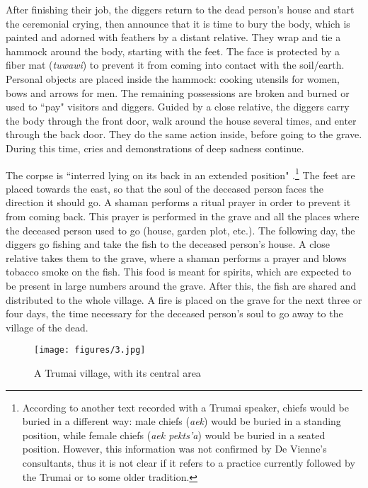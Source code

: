 \documentclass[output=paper,
modfonts,nonflat
]{langsci/langscibook}
\begin{document}
After finishing their job, the diggers return to the dead person's house and start the ceremonial crying, then announce that it is time to bury the body, which is painted and adorned with feathers by a distant relative. They wrap and tie a hammock around the body, starting with the feet. The face is protected by a fiber mat (\textit{tuwawi}) to prevent it from coming into contact with the soil/earth. Personal objects are placed inside the hammock: cooking utensils for women, bows and arrows for men. The remaining possessions are broken and burned or used to “pay" visitors and diggers. Guided by a close relative, the diggers carry the body through the front door, walk around the house several times, and enter through the back door. They do the same action inside, before going to the grave. During this time, cries and demonstrations of deep sadness continue.

The corpse is “interred lying on its back in an extended position" \citep[90]{MurphyQuain1955}.\footnote{According to another text recorded with a Trumai speaker, chiefs would be buried in a different way: male chiefs (\textit{aek}) would be buried in a standing position, while female chiefs (\textit{aek pekts'a}) would be buried in a seated position. However, this information was not confirmed by De Vienne's consultants, thus it is not clear if it refers to a practice currently followed by the Trumai or to some older tradition.} The feet are placed towards the east, so that the soul of the deceased person faces the direction it should go. A shaman performs a ritual prayer in order to prevent it from coming back. This prayer is performed in the grave and all the places where the deceased person used to go (house, garden plot, etc.). The following day, the diggers go fishing and take the fish to the deceased person's house. A close relative takes them to the grave, where a shaman performs a prayer and blows tobacco smoke on the fish. This food is meant for spirits, which are expected to be present in large numbers around the grave. After this, the fish are shared and distributed to the whole village. A fire is placed on the grave for the next three or four days, the time necessary for the deceased person's soul to go away to the village of the dead.



\begin{figure} 
  \texttt{[image: figures/3.jpg]}
  \caption{A Trumai village, with its central area}
\end{figure}
\end{document}
